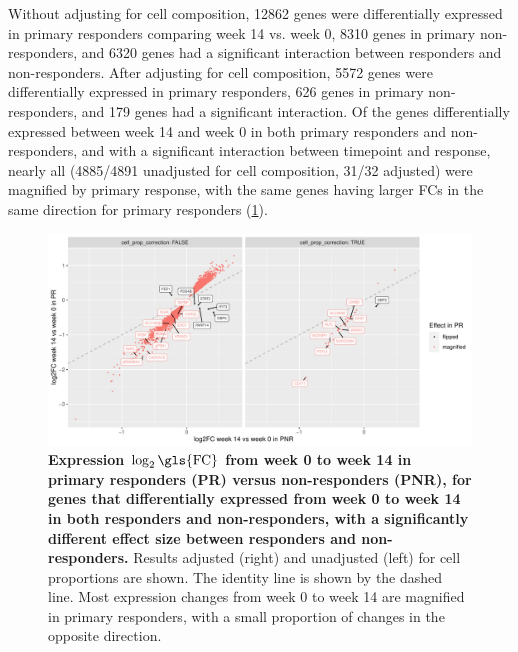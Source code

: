 Without adjusting for cell composition,
\num{12862} genes were differentially expressed in primary responders comparing week 14 vs. week 0,
\num{8310} genes in primary non-responders,
and \num{6320} genes had a significant interaction between responders and non-responders.
After adjusting for cell composition, 
\num{5572} genes were differentially expressed in primary responders,
\num{626} genes in primary non-responders,
and \num{179} genes had a significant interaction.
Of the genes differentially expressed between week 14 and week 0 in both primary responders and non-responders,
and with a significant interaction between timepoint and response, 
nearly all (\num{4885/4891} unadjusted for cell composition, \num{31/32} adjusted) were magnified by primary response,
with the same genes having larger \glspl{FC} in the same direction for primary responders (\cref{fig:multipants_dge_logFC_C_3R_1R_vs_logFC_C_3N_1N}).

\begin{figure}
    \centering
    \includegraphics[width=1.0\textwidth,page=1]{mainmatter/figures/chapter_04/plot_gene_set_enrichment.logFC_C_3R_1R_vs_logFC_C_3N_1N.pdf}
    \caption[
    ]{
        \textbf{
            Expression $\log_2\text{\gls{FC}}$ from week 0 to week 14 in primary responders (PR) versus non-responders (PNR),
            for genes that differentially expressed from week 0 to week 14 in both responders and non-responders, 
            with a significantly different effect size between responders and non-responders.
        }
        Results adjusted (right) and unadjusted (left) for cell proportions are shown.
        The identity line is shown by the dashed line.
        Most expression changes from week 0 to week 14 are magnified in primary responders, with a small proportion of changes in the opposite direction.
    }
    \label{fig:multipants_dge_logFC_C_3R_1R_vs_logFC_C_3N_1N}
\end{figure}

